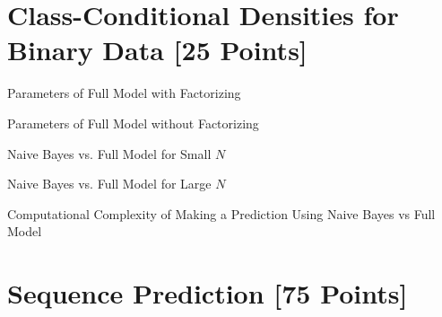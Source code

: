 \newif\ifshowsolutions
\showsolutionstrue







\pagestyle{fancy}


\section{Class-Conditional Densities for Binary Data [25 Points]}

\problem[5] Parameters of Full Model with Factorizing
\begin{subsolution}\normalfont{
	
}\end{subsolution}
\clearpage

\problem[5] Parameters of Full Model without Factorizing
\begin{subsolution}\normalfont{
	
}\end{subsolution}
\clearpage

\problem[2] Naive Bayes vs. Full Model for Small $N$
\begin{subsolution}\normalfont{
	
}\end{subsolution}
\clearpage

\problem[2] Naive Bayes vs. Full Model for Large $N$
\begin{subsolution}\normalfont{
	
}\end{subsolution}
\clearpage

\problem[11] Computational Complexity of Making a Prediction Using Naive Bayes vs Full Model
\begin{subsolution}\normalfont{
	
}\end{subsolution}
\clearpage


\newpage
\section{Sequence Prediction [75 Points]}

